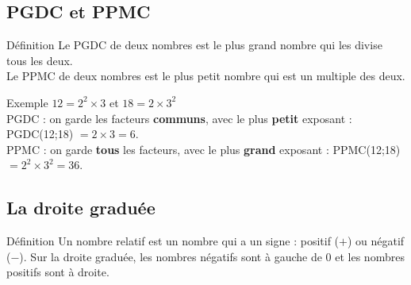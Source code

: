 \subsection{PGDC et PPMC}

\begin{regle}{Définition}
Le \textcolor{themeColor}{PGDC} de deux nombres est le plus grand nombre qui les divise tous les deux.\\[3pt]
Le \textcolor{themeColor}{PPMC} de deux nombres est le plus petit nombre qui est un multiple des deux.
\end{regle}

\vspace{6pt}
\begin{astuce}{Exemple}
$12 = 2^2 \times 3$ \quad et \quad $18 = 2 \times 3^2$\\[3pt]
PGDC : on garde les facteurs \textbf{communs}, avec le plus \textbf{petit} exposant : PGDC(12;18) $=2 \times 3 = 6$.\\
PPMC : on garde \textbf{tous} les facteurs, avec le plus \textbf{grand} exposant : PPMC(12;18) $=2^2 \times 3^2 = 36$.
\end{astuce}

\newpage
\semaineinvisible
{}

\vfill
\subsection{La droite graduée}

\begin{regle}{Définition}
Un nombre \textcolor{themeColor}{relatif} est un nombre qui a un signe : positif ($+$) ou négatif ($-$). Sur la droite graduée, les nombres négatifs sont à gauche de $0$ et les nombres positifs sont à droite.
\end{regle}

\vspace{6pt}
\begin{center}
\end{center}

